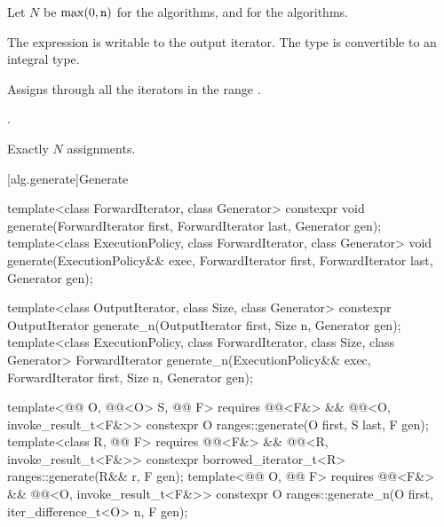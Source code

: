 \begin{itemdescr}
\pnum
Let $N$ be $\max(0, \tcode{n})$ for the  algorithms, and
 for the  algorithms.

\pnum
\mandates
The expression 
is writable to the output iterator.
The type  is convertible
to an integral type.

\pnum
\effects
Assigns 
through all the iterators in the range .

\pnum
\returns
{}.

\pnum
\complexity
Exactly $N$ assignments.
\end{itemdescr}

[alg.generate]{Generate}

%
%
\begin{itemdecl}
template<class ForwardIterator, class Generator>
  constexpr void generate(ForwardIterator first, ForwardIterator last,
                          Generator gen);
template<class ExecutionPolicy, class ForwardIterator, class Generator>
  void generate(ExecutionPolicy&& exec,
                ForwardIterator first, ForwardIterator last,
                Generator gen);

template<class OutputIterator, class Size, class Generator>
  constexpr OutputIterator generate_n(OutputIterator first, Size n, Generator gen);
template<class ExecutionPolicy, class ForwardIterator, class Size, class Generator>
  ForwardIterator generate_n(ExecutionPolicy&& exec,
                             ForwardIterator first, Size n, Generator gen);

template<@@ O, @@<O> S, @@ F>
  requires @@<F&> && @@<O, invoke_result_t<F&>>
  constexpr O ranges::generate(O first, S last, F gen);
template<class R, @@ F>
  requires @@<F&> && @@<R, invoke_result_t<F&>>
  constexpr borrowed_iterator_t<R> ranges::generate(R&& r, F gen);
template<@@ O, @@ F>
  requires @@<F&> && @@<O, invoke_result_t<F&>>
  constexpr O ranges::generate_n(O first, iter_difference_t<O> n, F gen);
\end{itemdecl}

